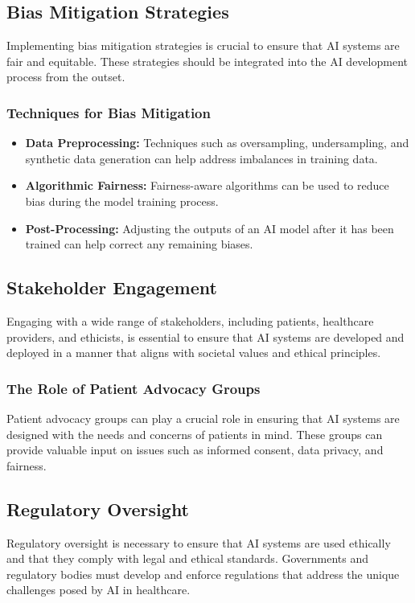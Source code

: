 \documentclass{article}
\begin{document}
\subsection{Bias Mitigation Strategies}
Implementing bias mitigation strategies is crucial to ensure that AI systems are fair and equitable. These strategies should be integrated into the AI development process from the outset.

\subsubsection{Techniques for Bias Mitigation}
\begin{itemize}
    \item \textbf{Data Preprocessing:} Techniques such as oversampling, undersampling, and synthetic data generation can help address imbalances in training data.
    \item \textbf{Algorithmic Fairness:} Fairness-aware algorithms can be used to reduce bias during the model training process.
    \item \textbf{Post-Processing:} Adjusting the outputs of an AI model after it has been trained can help correct any remaining biases.
\end{itemize}

\subsection{Stakeholder Engagement}
Engaging with a wide range of stakeholders, including patients, healthcare providers, and ethicists, is essential to ensure that AI systems are developed and deployed in a manner that aligns with societal values and ethical principles.

\subsubsection{The Role of Patient Advocacy Groups}
Patient advocacy groups can play a crucial role in ensuring that AI systems are designed with the needs and concerns of patients in mind. These groups can provide valuable input on issues such as informed consent, data privacy, and fairness.

\subsection{Regulatory Oversight}
Regulatory oversight is necessary to ensure that AI systems are used ethically and that they comply with legal and ethical standards. Governments and regulatory bodies must develop and enforce regulations that address the unique challenges posed by AI in healthcare.
\end{document}
